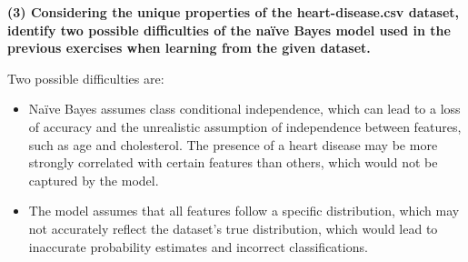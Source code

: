 \documentclass[12pt]{article}
\begin{document}
    \vspace{20pt}
    \textbf{(3) Considering the unique properties of the heart-disease.csv dataset, identify two
    possible diﬃculties of the naïve Bayes model used in the previous exercises when learning
    from the given dataset.}

    \vspace{10pt}
    Two possible difficulties are:

    \begin{itemize}
        \item Naïve Bayes assumes class conditional independence, which can lead to a loss of accuracy and the unrealistic assumption of independence between features, such as age and cholesterol. The presence of a heart disease may be more strongly correlated with certain features than others, which would not be captured by the model.
        \item The model assumes that all features follow a specific distribution, which may not accurately reflect the dataset's true distribution, which would lead to inaccurate probability estimates and incorrect classifications.
    \end{itemize}
\end{document}

